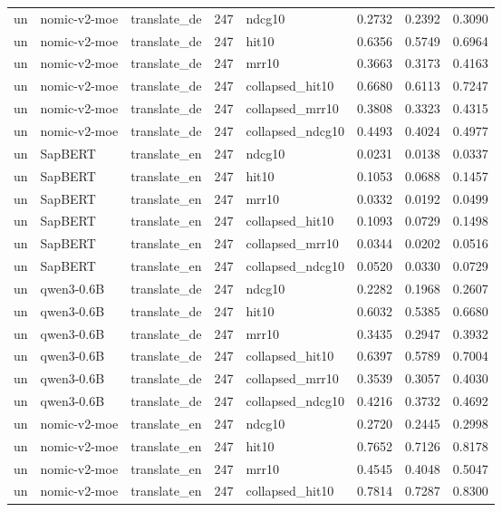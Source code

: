\begin{tabular}{lllrlrrr}
un & nomic-v2-moe & translate\_de & 247 & ndcg10 & 0.2732 & 0.2392 & 0.3090 \\
un & nomic-v2-moe & translate\_de & 247 & hit10 & 0.6356 & 0.5749 & 0.6964 \\
un & nomic-v2-moe & translate\_de & 247 & mrr10 & 0.3663 & 0.3173 & 0.4163 \\
un & nomic-v2-moe & translate\_de & 247 & collapsed\_hit10 & 0.6680 & 0.6113 & 0.7247 \\
un & nomic-v2-moe & translate\_de & 247 & collapsed\_mrr10 & 0.3808 & 0.3323 & 0.4315 \\
un & nomic-v2-moe & translate\_de & 247 & collapsed\_ndcg10 & 0.4493 & 0.4024 & 0.4977 \\
un & SapBERT & translate\_en & 247 & ndcg10 & 0.0231 & 0.0138 & 0.0337 \\
un & SapBERT & translate\_en & 247 & hit10 & 0.1053 & 0.0688 & 0.1457 \\
un & SapBERT & translate\_en & 247 & mrr10 & 0.0332 & 0.0192 & 0.0499 \\
un & SapBERT & translate\_en & 247 & collapsed\_hit10 & 0.1093 & 0.0729 & 0.1498 \\
un & SapBERT & translate\_en & 247 & collapsed\_mrr10 & 0.0344 & 0.0202 & 0.0516 \\
un & SapBERT & translate\_en & 247 & collapsed\_ndcg10 & 0.0520 & 0.0330 & 0.0729 \\
un & qwen3-0.6B & translate\_de & 247 & ndcg10 & 0.2282 & 0.1968 & 0.2607 \\
un & qwen3-0.6B & translate\_de & 247 & hit10 & 0.6032 & 0.5385 & 0.6680 \\
un & qwen3-0.6B & translate\_de & 247 & mrr10 & 0.3435 & 0.2947 & 0.3932 \\
un & qwen3-0.6B & translate\_de & 247 & collapsed\_hit10 & 0.6397 & 0.5789 & 0.7004 \\
un & qwen3-0.6B & translate\_de & 247 & collapsed\_mrr10 & 0.3539 & 0.3057 & 0.4030 \\
un & qwen3-0.6B & translate\_de & 247 & collapsed\_ndcg10 & 0.4216 & 0.3732 & 0.4692 \\
un & nomic-v2-moe & translate\_en & 247 & ndcg10 & 0.2720 & 0.2445 & 0.2998 \\
un & nomic-v2-moe & translate\_en & 247 & hit10 & 0.7652 & 0.7126 & 0.8178 \\
un & nomic-v2-moe & translate\_en & 247 & mrr10 & 0.4545 & 0.4048 & 0.5047 \\
un & nomic-v2-moe & translate\_en & 247 & collapsed\_hit10 & 0.7814 & 0.7287 & 0.8300 \\

\end{tabular}
